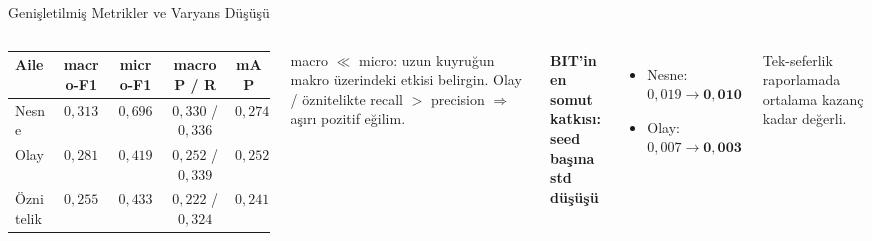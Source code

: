 \documentclass[10pt,aspectratio=169]{beamer}
\begin{document}
\begin{frame}{Genişletilmiş Metrikler ve Varyans Düşüşü}
  \begin{columns}[T,onlytextwidth]
      \footnotesize
      \begin{tabular}{lcccc}
        \toprule
        Aile & macro-F1 & micro-F1 & macro P / R & mAP \\
        \midrule
        Nesne     & $0{,}313$ & $0{,}696$ & $0{,}330$ / $0{,}336$ & $0{,}274$ \\
        Olay      & $0{,}281$ & $0{,}419$ & $0{,}252$ / $0{,}339$ & $0{,}252$ \\
        Öznitelik & $0{,}255$ & $0{,}433$ & $0{,}222$ / $0{,}324$ & $0{,}241$ \\
        \bottomrule
      \end{tabular}

      \vspace{0.8em}
      \normalsize
      \footnotesize
      macro $\ll$ micro: uzun kuyruğun makro üzerindeki etkisi belirgin.
      Olay / öznitelikte recall $>$ precision $\Rightarrow$ aşırı pozitif eğilim.

      \textbf{BIT'in en somut katkısı: \\ seed başına std düşüşü}
      \vspace{0.5em}
      \begin{itemize}
        \item Nesne: $0{,}019 \to \mathbf{0{,}010}$
        \item Olay:  $0{,}007 \to \mathbf{0{,}003}$
      \end{itemize}
      \vspace{0.5em}
      Tek-seferlik raporlamada ortalama kazanç kadar değerli.
  \end{columns}
\end{frame}
\end{document}
